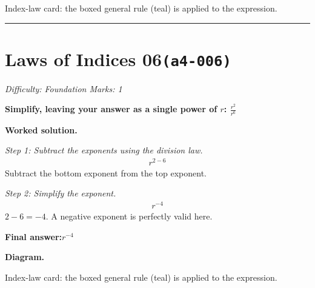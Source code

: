 \documentclass[11pt]{article}
\newcommand{\question}[1]{\par\medskip\noindent\textbf{#1}\par}
\begin{document}
\begin{center}
\end{center}
\small Index-law card: the boxed general rule (teal) is applied to the expression.\normalsize

\medskip\hrule

\section*{Laws of Indices 06\quad\small\texttt{(a4-006)}}
\textit{Difficulty: Foundation \quad\textbar\quad Marks: 1}

\question{Simplify, leaving your answer as a single power of \( r \): \( \frac{r^2}{r^6} \)}

\textbf{Worked solution.}

\textit{Step 1: Subtract the exponents using the division law.}
\[\begin{gathered}
r^{2-6}
\end{gathered}\]
Subtract the bottom exponent from the top exponent.

\textit{Step 2: Simplify the exponent.}
\[\begin{gathered}
r^{-4}
\end{gathered}\]
\( 2 - 6 = -4 \). A negative exponent is perfectly valid here.

\begin{answerbox}
\textbf{Final answer:}\quad \(\displaystyle r^{-4}\)
\end{answerbox}
\textbf{Diagram.}

\begin{center}
\end{center}
\small Index-law card: the boxed general rule (teal) is applied to the expression.\normalsize
\end{document}
